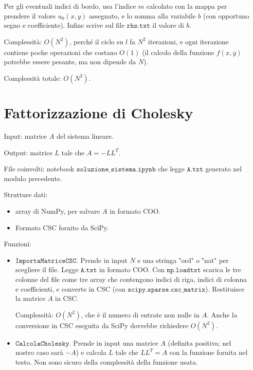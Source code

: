 \documentclass{article}
\begin{document}
\begin{itemize}
Per gli eventuali indici di bordo, usa l'indice $m$ calcolato con la mappa per prendere il valore $u_0(x,y)$ assegnato, e lo somma alla variabile $b$ (con opportuno segno e coefficiente).
Infine scrive sul file $\texttt{rhs.txt}$ il valore di $b$.

Complessità: $O(N^2)$, perché il ciclo su $l$ fa $N^2$ iterazioni, e ogni iterazione contiene poche operazioni che costano $O(1)$ (il calcolo della funzione $f(x,y)$ potrebbe essere pesante, ma non dipende da $N$).

\end{itemize}

Complessità totale: $O(N^2)$.

\section{Fattorizzazione di Cholesky}
Input: matrice $A$ del sistema lineare.

Output: matrice $L$ tale che $A = -LL^T$.

File coinvolti: notebook $\texttt{soluzione\_sistema.ipynb}$ che legge $\texttt{A.txt}$ generato nel modulo precedente.

Strutture dati:
\begin{itemize}
\item array di NumPy, per salvare $A$ in formato COO. 
\item Formato CSC fornito da SciPy.
\end{itemize}

Funzioni:
\begin{itemize}
\item $\texttt{ImportaMatriceCSC}$.
Prende in input $N$ e una stringa "ord" o "nat" per scegliere il file.
Legge $\texttt{A.txt}$ in formato COO.
Con $\texttt{np.loadtxt}$ scarica le tre colonne del file come tre array che contengono indici di riga, indici di colonna e coefficienti, e converte in CSC (con $\texttt{scipy.sparse.csc\_matrix}$).
Restituisce la matrice $A$ in CSC.

Complessità: $O(N^2)$, che è il numero di entrate non nulle in $A$. Anche la conversione in CSC eseguita da SciPy dovrebbe richiedere $O(N^2)$.

\item $\texttt{CalcolaCholesky}$.
Prende in input una matrice $A$ (definita positiva; nel nostro caso sarà $-A$) e calcola $L$ tale che $LL^T = A$ con la funzione fornita nel testo.
Non sono sicuro della complessità della funzione usata.

\end{itemize}
\end{document}
